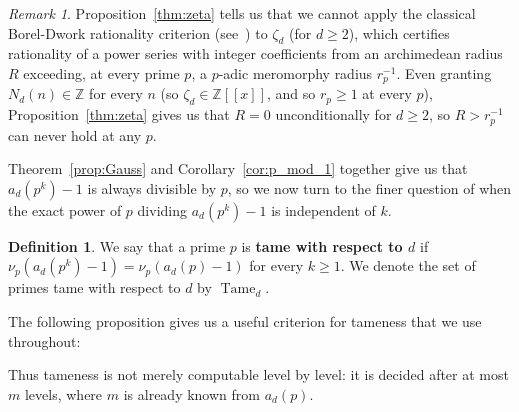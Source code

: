 \documentclass{article}
\theoremstyle{plain}
\theoremstyle{definition}
\newtheorem{definition}[theorem]{Definition}
\theoremstyle{remark}
\newtheorem{remark}[theorem]{Remark}
\newcommand{\Z}{\mathbb{Z}}
\DeclareMathOperator{\Tame}{Tame}
\begin{document}
\begin{remark}
    Proposition~\ref{thm:zeta} tells us that we cannot apply the classical Borel-Dwork rationality criterion (see~\cite{Borel1894,Dwork1960}) to $\zeta_d$ (for $d \geq 2$), which certifies rationality of a power series with integer coefficients from an archimedean radius $R$ exceeding, at every prime $p$, a $p$-adic meromorphy radius $r_p^{-1}$. Even granting $N_d(n)\in\Z$ for every $n$ (so $\zeta_d\in\Z[[x]]$, and so $r_p\ge1$ at every $p$), Proposition~\ref{thm:zeta} gives us that $R=0$ unconditionally for $d\ge2$, so $R>r_p^{-1}$ can never hold at any $p$.
\end{remark}



Theorem~\ref{prop:Gauss} and Corollary~\ref{cor:p_mod_1} together give us that $a_d(p^k)-1$ is always divisible by $p$, so we now turn to the finer question of when the exact power of $p$ dividing $a_d(p^k)-1$ is independent of $k$.

\begin{definition}\label{def:tame}
We say that a prime $p$ is \textbf{tame with respect to $d$} if $\nu_p(a_d(p^k)-1)=\nu_p(a_d(p)-1)$ for every $k\ge1$. We denote the set of primes tame with respect to $d$ by $\Tame_d$.
\end{definition}

The following proposition gives us a useful criterion for tameness that we use throughout:


Thus tameness is not merely computable level by level: it is decided after at most $m$ levels, where $m$ is already known from $a_d(p)$.
\end{document}
